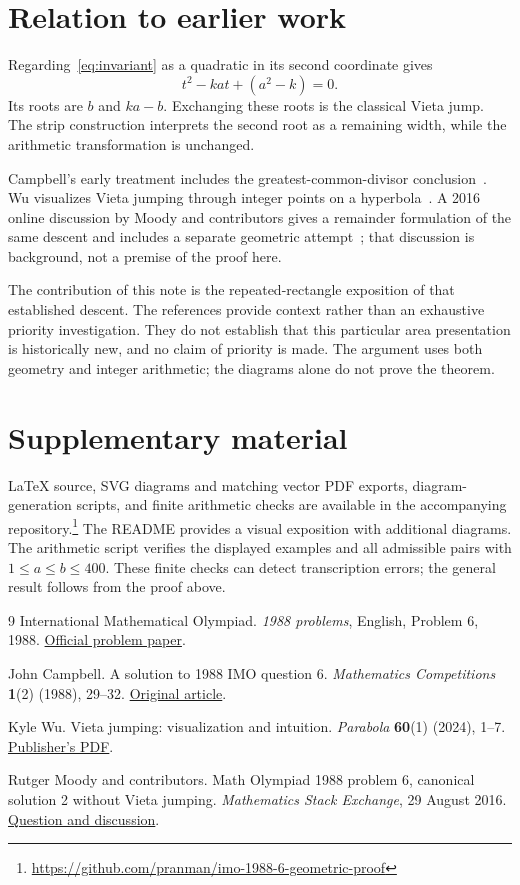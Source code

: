 \documentclass[11pt,a4paper]{article}
\begin{document}
\section{Relation to earlier work}\label{sec:context}
Regarding~\eqref{eq:invariant} as a quadratic in its second coordinate gives
\[
 t^2-kat+(a^2-k)=0.
\]
Its roots are $b$ and $ka-b$. Exchanging these roots is the classical
Vieta jump. The strip construction interprets the second root as a
remaining width, while the arithmetic transformation is unchanged.

Campbell's early treatment includes the greatest-common-divisor
conclusion~\cite{campbell}. Wu visualizes Vieta jumping through integer
points on a hyperbola~\cite{wu}. A 2016 online discussion by Moody and
contributors gives a remainder formulation of the same descent and
includes a separate geometric attempt~\cite{moody}; that discussion is
background, not a premise of the proof here.

The contribution of this note is the repeated-rectangle exposition of
that established descent. The references provide context rather than an
exhaustive priority investigation. They do not establish that this
particular area presentation is historically new, and no claim of
priority is made. The argument uses both geometry and integer arithmetic;
the diagrams alone do not prove the theorem.

\section*{Supplementary material}
LaTeX source, SVG diagrams and matching vector PDF exports, diagram-generation
scripts, and finite arithmetic checks are available in the accompanying
repository.\footnote{\url{https://github.com/pranman/imo-1988-6-geometric-proof}}
The README provides a visual exposition
with additional diagrams. The arithmetic script verifies the displayed
examples and all admissible pairs with $1\le a\le b\le400$. These finite
checks can detect transcription errors; the general result follows from
the proof above.

\begin{thebibliography}{9}
International Mathematical Olympiad.
\emph{1988 problems}, English, Problem 6, 1988.
\href{https://www.imo-official.org/assets/documents/problems/1988/1988_eng.pdf}{Official problem paper}.

John Campbell.
A solution to 1988 IMO question 6.
\emph{Mathematics Competitions} \textbf{1}(2) (1988), 29--32.
\href{https://www.wfnmc.org/mc19882campbell.pdf}{Original article}.

Kyle Wu.
Vieta jumping: visualization and intuition.
\emph{Parabola} \textbf{60}(1) (2024), 1--7.
\href{https://www.parabola.unsw.edu.au/sites/default/files/2024-05/vol60_no1_8.pdf}{Publisher's PDF}.

Rutger Moody and contributors.
Math Olympiad 1988 problem 6, canonical solution 2 without Vieta jumping.
\emph{Mathematics Stack Exchange}, 29 August 2016.
\href{https://math.stackexchange.com/questions/1906908/math-olympiad-1988-problem-6-canonical-solution-2-without-vieta-jumping}{Question and discussion}.
\end{thebibliography}
\end{document}
